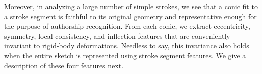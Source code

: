 Moreover, in analyzing a large number of simple strokes, we see that a conic fit to a stroke segment is faithful to its original geometry and representative enough for the purpose of authorship recognition. From each conic, we extract eccentricity, symmetry, local consistency, and inflection features that are conveniently invariant to rigid-body deformations. Needless to say, this invariance also holds when the entire sketch is represented using stroke segment features. We give a description of these four features next.


